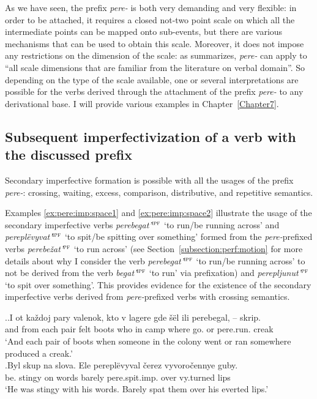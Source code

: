 As we have seen, the prefix \textit{pere-} is both very demanding and very flexible: in order to be attached, it requires a closed not-two point scale on which all the intermediate points can be mapped onto sub-events, but there are various mechanisms that can be used to obtain this scale. Moreover, it does not impose any restrictions on the dimension of the scale: as \citet[151]{Kagan:book} summarizes, \textit{pere-} can apply to ``all scale dimensions that are familiar from the literature on verbal domain''. So depending on the type of the scale available, one or several interpretations are possible for the verbs derived through the attachment of the prefix \textit{pere-} to any derivational base. I will provide various examples in Chapter~\ref{Chapter7}.

\subsection{Subsequent imperfectivization of a verb with the discussed prefix}
Secondary imperfective formation is possible with all the usages of the prefix \textit{pere-}: crossing, waiting, excess, comparison, distributive, and repetitive semantics.

Examples \ref{ex:pere:imp:space1} and \ref{ex:pere:imp:space2} illustrate the usage of the secondary imperfective verbs \textit{perebegat'}$^{\textsc{ipf}}$ `to run/be running across' and \textit{perepl\"{e}vyvat'}$^{\textsc{ipf}}$ `to spit/be spitting over something' formed from the \textit{pere-}prefixed verbs \textit{perebe\v{z}at'}$^{\textsc{pf}}$ `to run across' (see Section~\ref{subsection:perf:motion} for more details about why I consider the verb \textit{pe\-re\-be\-gat'}$^{\textsc{ipf}}$ `to run/be running across' to not be derived from the verb \textit{begat'}$^{\textsc{ipf}}$ `to run' via prefixation) and \textit{perepljunut'}$^{\textsc{pf}}$ `to spit over something'. This provides evidence for the existence of the secondary imperfective verbs derived from \textit{pere-}prefixed verbs with crossing semantics.

\ex.\ag.\label{ex:pere:imp:space1}I ot ka\v{z}doj pary valenok, kto v lagere gde \v{s}\"{e}l ili perebegal, -- skrip.\\
and from each pair {felt boots} who in camp where go. or pere.run. {} creak\\
\trans `And each pair of boots when someone in the colony went or ran somewhere produced a creak.'\\
\bg.\label{ex:pere:imp:space2}Byl skup na slova. Ele perepl\"{e}vyval \v{c}erez vyvoro\v{c}ennye guby.\\
be. stingy on words barely pere.spit.imp. over vy.turned lips\\
\trans `He was stingy with his words. Barely spat them over his everted lips.'\\

